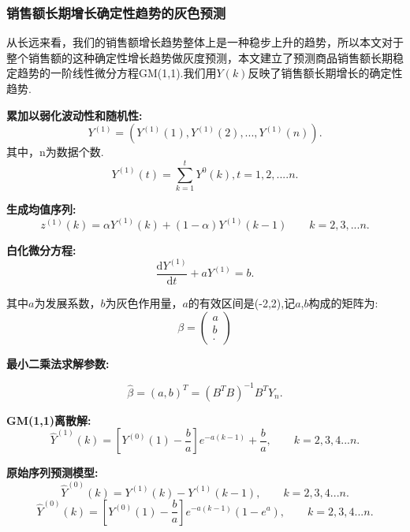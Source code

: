 \documentclass{whutmod}
\begin{document}
	
	\subsubsection{销售额长期增长确定性趋势的灰色预测}
	从长远来看，我们的销售额增长趋势整体上是一种稳步上升的趋势，所以本文对于整个销售额的这种确定性增长趋势做灰度预测，本文建立了预测商品销售额长期稳定趋势的一阶线性微分方程GM(1,1).我们用$Y(k)$反映了销售额长期增长的确定性趋势.
	
	\textbf{累加以弱化波动性和随机性:}
	\begin{equation}
	Y^{(1)}=(Y^{(1)}(1),Y^{(1)}(2),...,Y^{(1)}(n)).
	\end{equation}
	其中，n为数据个数.
	\begin{equation}
	Y^{(1)}(t)=\sum_{k=1}^{t}Y^{0}(k),t=1,2,....n.
	\end{equation}
	
	\textbf{生成均值序列:}
	\begin{equation}
	z^{(1)}(k)=\alpha Y^{(1)}(k)+(1-\alpha)Y^{(1)}(k-1)\qquad k=2,3,...n.
	\end{equation}
	
	\textbf{白化微分方程:}
	\begin{equation}
	\frac{\mathrm{d}Y^{(1)}}{\mathrm{d}t}+aY^{(1)}=b.
	\end{equation}
	
	其中$a$为发展系数，$b$为灰色作用量，$a$的有效区间是(-2,2),记$a$,$b$构成的矩阵为:
	\begin{equation}
	\beta={
	\left( \begin{array}{c}
	a\\
	b\\
	.\end{array} 
	\right)}
	\end{equation}
	
	
	\textbf{最小二乘法求解参数:}
	
	\begin{equation}
	\hat \beta=(a,b)^T={(B^{T}B)}^{-1}B^{T}Y_{n}.
	\end{equation}
	
	
	
	\textbf{GM(1,1)离散解:}
	\begin{equation}
	\hat Y^{(1)}(k)=[Y^{(0)}(1)-\frac{b}{a}]e^{-a(k-1)}+\frac{b}{a}, \qquad k=2,3,4...n.
	\end{equation}
	
	\textbf{原始序列预测模型:}
	\begin{equation}
	\hat Y^{(0)}(k)= Y^{(1)}(k)-Y^{(1)}(k-1),\qquad k=2,3,4...n.
	\end{equation}
	\begin{equation}
		\hat Y^{(0)}(k)=[Y^{(0)}(1)-\frac{b}{a}]e^{-a(k-1)}(1-e^a),\qquad k=2,3,4...n.
	\end{equation}
\end{document}
